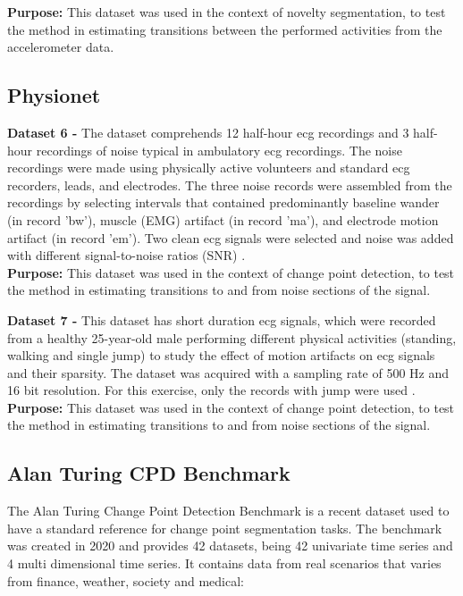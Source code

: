 \textbf{Purpose:} This dataset was used in the context of novelty segmentation, to test the method in estimating transitions between the performed activities from the accelerometer data.

\subsection{Physionet}

\textbf{Dataset 6 - } The dataset comprehends 12 half-hour \gls{ecg} recordings and 3 half-hour recordings of noise typical in ambulatory \gls{ecg} recordings. The noise recordings were made using physically active volunteers and standard \gls{ecg} recorders, leads, and electrodes. The three noise records were assembled from the recordings by selecting intervals that contained predominantly baseline wander (in record 'bw'), muscle (EMG) artifact (in record 'ma'), and electrode motion artifact (in record 'em'). Two clean \gls{ecg} signals were selected and noise was added with different signal-to-noise ratios (SNR) \cite{dataset6, PhysioNet}.\\

\textbf{Purpose:} This dataset was used in the context of change point detection, to test the method in estimating transitions to and from noise sections of the signal.
    
\textbf{Dataset 7 - } This dataset has short duration \gls{ecg} signals, which were recorded from a healthy 25-year-old male performing different physical activities (standing, walking and single jump) to study the effect of motion artifacts on \gls{ecg} signals and their sparsity. The dataset was acquired with a sampling rate of 500 Hz and 16 bit resolution. For this exercise, only the records with jump were used \cite{dataset7, PhysioNet}.\\

\textbf{Purpose:} This dataset was used in the context of change point detection, to test the method in estimating transitions to and from noise sections of the signal.


\subsection{Alan Turing CPD Benchmark}
\label{sec:dataset8}

The Alan Turing Change Point Detection Benchmark is a recent dataset used to have a standard reference for change point segmentation tasks. The benchmark was created in 2020 and provides 42 datasets, being 42 univariate time series and 4 multi dimensional time series. It contains data from real scenarios that varies from finance, weather, society and medical:


